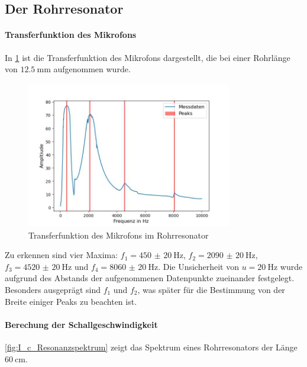 \documentclass[../main.tex]{subfiles}
\begin{document}
    
\subsection{Der Rohrresonator}
    \paragraph{Transferfunktion des Mikrofons}
        In \ref{fig:I_Transferfunktion} ist die Transferfunktion des Mikrofons dargestellt, die bei einer Rohrlänge von $\SI{12.5}{\milli\metre}$ aufgenommen wurde.

        \begin{figure}[H]
            \centering
            \includegraphics[width=0.8\textwidth]{Bilddateien/Auswertung/I_Transferfunktion.jpg}
            \caption{Transferfunktion des Mikrofons im Rohrresonator}
            \label{fig:I_Transferfunktion}
        \end{figure}

        Zu erkennen sind vier Maxima: $f_1=\SI{450(20)}{\hertz}$, $f_2=\SI{2090(20)}{\hertz}$, $f_3=\SI{4520(20)}{\hertz}$ und $f_4=\SI{8060(20)}{\hertz}$. Die Unsicherheit von $u=\SI{20}{\hertz}$ wurde aufgrund des Abstands der aufgenommenen Datenpunkte zueinander festgelegt. Besonders ausgeprägt sind $f_1$ und $f_2$, was später für die Bestimmung von der Breite einiger Peaks zu beachten ist.
    
    \paragraph{Berechung der Schallgeschwindigkeit}
        \ref{fig:I_c_Resonanzspektrum} zeigt das Spektrum eines Rohrresonators der Länge $\SI{60}{\centi\metre}$.
\end{document}
